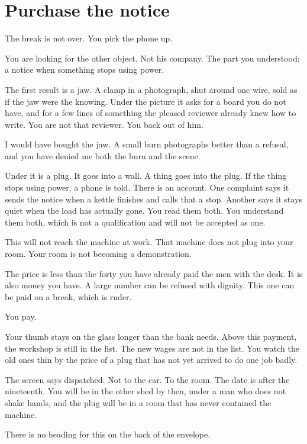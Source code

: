 \documentclass[11pt,oneside]{book}
\begin{document}
\section*{Purchase the notice}

The break is not over. You pick the phone up.

You are looking for the other object. Not his company. The part you understood: a notice when something stops using power.

The first result is a jaw. A clamp in a photograph, shut around one wire, sold as if the jaw were the knowing. Under the picture it asks for a board you do not have, and for a few lines of something the pleased reviewer already knew how to write. You are not that reviewer. You back out of him.

I would have bought the jaw. A small burn photographs better than a refusal, and you have denied me both the burn and the scene.

Under it is a plug. It goes into a wall. A thing goes into the plug. If the thing stops using power, a phone is told. There is an account. One complaint says it sends the notice when a kettle finishes and calls that a stop. Another says it stays quiet when the load has actually gone. You read them both. You understand them both, which is not a qualification and will not be accepted as one.

This will not reach the machine at work. That machine does not plug into your room. Your room is not becoming a demonstration.

The price is less than the forty you have already paid the men with the desk. It is also money you have. A large number can be refused with dignity. This one can be paid on a break, which is ruder.

You pay.

Your thumb stays on the glass longer than the bank needs. Above this payment, the workshop is still in the list. The new wages are not in the list. You watch the old ones thin by the price of a plug that has not yet arrived to do one job badly.

The screen says dispatched. Not to the car. To the room. The date is after the nineteenth. You will be in the other shed by then, under a man who does not shake hands, and the plug will be in a room that has never contained the machine.

There is no heading for this on the back of the envelope.
\end{document}
